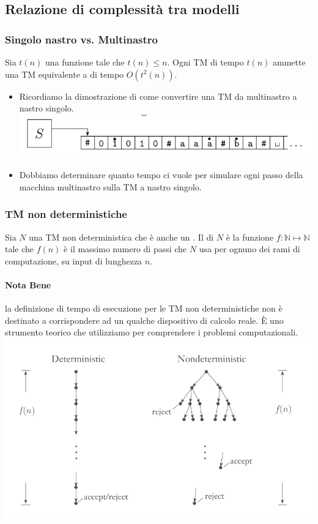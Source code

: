 \subsection{Relazione di complessità tra modelli}
\subsubsection{Singolo nastro vs. Multinastro}
\begin{theorem}
  Sia $t(n)$ una funzione tale che $t(n) \leq n$. Ogni TM 
  di tempo $t(n)$ ammette una TM equivalente a  di tempo 
  $O(t^2(n))$.
\end{theorem}
\begin{itemize}
  \item Ricordiamo la dimostrazione di come convertire una TM da multinastro 
    a nastro singolo.
    \includegraphics[scale=0.5]{img/nastro.png}
  \item Dobbiamo determinare quanto tempo ci vuole per simulare ogni passo 
    della macchina multinastro sulla TM a nastro singolo. 
\end{itemize}
\subsubsection{TM non deterministiche}
\begin{theorem}
  Sia $N$ una TM non deterministica che è anche un . 
  Il  di $N$ è la funzione $f: \mathbb{N}\mapsto \mathbb{N}$
  tale che $f(n)$ è il massimo numero di passi che $N$ usa per ognuno dei rami di computazione, 
  su input di lunghezza $n$. 
\end{theorem}
\paragraph{Nota Bene} la definizione di tempo di esecuzione per le TM non deterministiche 
non è destinato a corrispondere ad un qualche dispositivo di calcolo reale. 
È uno strumento teorico che utilizziamo per comprendere i problemi computazionali.\\
\includegraphics[scale=0.5]{img/tm_non_deterministiche.png}
